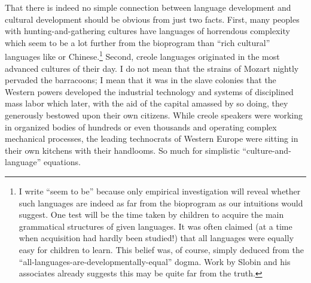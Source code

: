 That there is indeed no simple connection between language development and cultural development should be obvious from just two facts. First, many peoples with hunting-and-gathering cultures have languages of horrendous complexity which seem to be a lot further from the bioprogram than ``rich cultural'' languages like  or Chinese.\footnote{I write ``seem to be'' because only empirical investigation will reveal whether such languages are indeed as far from the bioprogram as our intuitions would suggest. One test will be the time taken by children to acquire the main grammatical structures of given languages. It was often claimed (at a time when acquisition had hardly been studied!) that all languages were equally easy for children to learn. This belief was, of course, simply deduced from the ``all-languages-are-developmentally-equal'' dogma. Work by Slobin and his associates already suggests this may be quite far from the truth.} Second, creole languages originated in the most advanced cultures of their day. I do not mean that the strains of Mozart nightly pervaded the barracoons; I mean that it was in the slave colonies that the Western powers developed the industrial technology and systems of disciplined mass labor which later, with the aid of the capital amassed by so doing, they generously bestowed upon their own citizens. While creole speakers were working in organized bodies of hundreds or even thousands and operating complex mechanical processes, the leading technocrats of Western Europe were sitting in their own kitchens with their handlooms. So much for simplistic ``culture-and-language'' equations.


